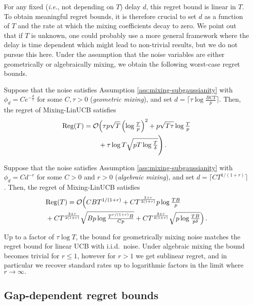 For any fixed (\emph{i.e.}, not depending on $T$) delay $d$, this regret bound is linear in $T$. To obtain meaningful regret bounds, it is therefore crucial to set $d$ as a function of $T$ and the rate at which the mixing coefficients decay to zero. We point out that if $T$ is unknown, one could probably use a more general framework where the delay is time dependent which might lead to non-trivial results, but we do not pursue this here. Under the assumption that the noise variables are either geometrically or algebraically mixing, we obtain the following worst-case regret bounds.

\begin{corollary}
\label{cor:geometric_mixing}
Suppose that the noise satisfies Assumption \ref{ass:mixing-subgaussianity} with $\phi_d=Ce^{-\frac{d}{\tau}}$ for some $C,\tau >0$ (\emph{geometric mixing}), and set $d = \lceil \tau\log\tfrac{BCT}{p}\rceil$. Then, the regret of Mixing-LinUCB satisfies
\begin{align*}
\mathrm{Reg}(T)=   \mathcal{O}&\Big(\tau p\sqrt{T}\left(\log \tfrac{T}{p}\right)^2  
+p\sqrt{T\tau}\log \tfrac{T}{p} \\&+ \tau\log T\sqrt{pT\log\tfrac{T}{\delta}}\Bigg)\,.
\end{align*}

\end{corollary}

\begin{corollary}
Suppose that the noise satisfies Assumption \ref{ass:mixing-subgaussianity} with $\phi_d=Cd^{-r}$ for some $C>0$ and $r >0$ (\emph{algebraic mixing}), and set $d=\lceil CT^{1/(1+r)}\rceil$. Then, the regret of Mixing-LinUCB satisfies
\begin{align*}
&\mathrm{Reg}(T) =\mathcal{O}\Big(CBT^{1/(1+r)} + CT^{\frac{3+r}{2(1+r)}}p\log\tfrac{TB}{p} \\&+ CT^{\frac{3+r}{2(1+r)}}\sqrt{Bp\log\tfrac{T^{r/(1+r)}B}{Cp}} + CT^{\frac{3+r}{2(1+r)}}\sqrt{p\log\tfrac{TB}{p\delta}}\Big)\,.
\end{align*}
\label{cor:algebraic_mixing}
\end{corollary}

Up to a factor of $\tau\log T$, the bound for geometrically mixing noise matches the regret bound for linear UCB with i.i.d.~noise. Under algebraic mixing the bound becomes trivial for $r\leq 1$, however for $r>1$ we get sublinear regret, and in particular we recover standard rates up to logarithmic factors in the limit where $r \to \infty.$

\subsection{Gap-dependent regret bounds}

